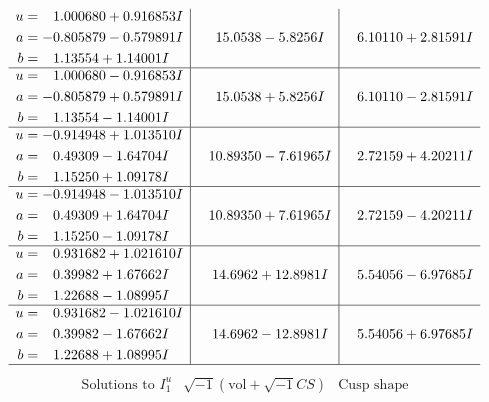 \documentclass[1p]{elsarticle_modified}
\theoremstyle{definition}
\newcommand{\I}{\sqrt{-1}}
\begin{document}
$$\begin{array}{c|c|c}
\begin{aligned}
u &= \phantom{-}1.000680 + 0.916853 I \\
a &= -0.805879 - 0.579891 I \\
b &= \phantom{-}1.13554 + 1.14001 I\end{aligned}
 & \phantom{-}15.0538 - 5.8256 I & \phantom{-}6.10110 + 2.81591 I \\ \hline\begin{aligned}
u &= \phantom{-}1.000680 - 0.916853 I \\
a &= -0.805879 + 0.579891 I \\
b &= \phantom{-}1.13554 - 1.14001 I\end{aligned}
 & \phantom{-}15.0538 + 5.8256 I & \phantom{-}6.10110 - 2.81591 I \\ \hline\begin{aligned}
u &= -0.914948 + 1.013510 I \\
a &= \phantom{-}0.49309 - 1.64704 I \\
b &= \phantom{-}1.15250 + 1.09178 I\end{aligned}
 & \phantom{-}10.89350 - 7.61965 I & \phantom{-}2.72159 + 4.20211 I \\ \hline\begin{aligned}
u &= -0.914948 - 1.013510 I \\
a &= \phantom{-}0.49309 + 1.64704 I \\
b &= \phantom{-}1.15250 - 1.09178 I\end{aligned}
 & \phantom{-}10.89350 + 7.61965 I & \phantom{-}2.72159 - 4.20211 I \\ \hline\begin{aligned}
u &= \phantom{-}0.931682 + 1.021610 I \\
a &= \phantom{-}0.39982 + 1.67662 I \\
b &= \phantom{-}1.22688 - 1.08995 I\end{aligned}
 & \phantom{-}14.6962 + 12.8981 I & \phantom{-}5.54056 - 6.97685 I \\ \hline\begin{aligned}
u &= \phantom{-}0.931682 - 1.021610 I \\
a &= \phantom{-}0.39982 - 1.67662 I \\
b &= \phantom{-}1.22688 + 1.08995 I\end{aligned}
 & \phantom{-}14.6962 - 12.8981 I & \phantom{-}5.54056 + 6.97685 I\\
 \hline 
 \end{array}$$\newpage$$\begin{array}{c|c|c}  
\text{Solutions to }I^u_{1}& \I (\text{vol} + \sqrt{-1}CS) & \text{Cusp shape}\\

\end{array}$$
\end{document}
